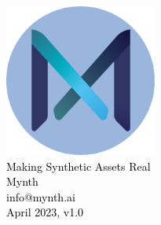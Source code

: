 \documentclass{article}
\begin{document}
\begin{sloppypar}

\begin{titlepage}
\sffamily\selectfont
\centering
\vspace*{7cm}
{\includegraphics[width=5cm]{
mynth-logo.pdf}}\\[5\baselineskip]
\textcolor{black}{
{\Huge Making Synthetic Assets Real}\\[2\baselineskip]
{\Large Mynth}\\[0.5\baselineskip]
{\large info@mynth.ai}\\[3\baselineskip]
{\large April 2023, v1.0}
}
\end{titlepage}

\tableofcontents



\end{sloppypar}
\end{document}
